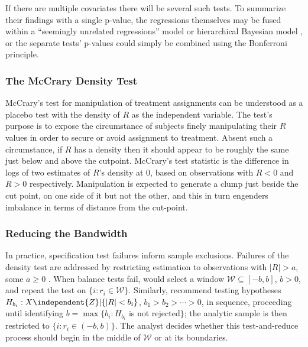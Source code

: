 If there are multiple
covariates there will be several such tests. To summarize their
findings with a single p-value, the
regressions themselves may be fused within a
``seemingly unrelated regressions'' model \citep{lee2010regression} or
hierarchical Bayesian model
\citep{liMatteiMealli2015BayesianRD}, or the
separate tests' p-values could simply be combined using the Bonferroni
principle.

\subsubsection{The McCrary Density Test}
McCrary's test for manipulation of treatment assignments
\citeyearpar{mccrary2008manipulation} can be understood as a %
placebo test with the density of $R$ as the independent variable.
The test's
purpose is to expose the circumstance of subjects finely manipulating their
$R$ values in order to secure or avoid assignment to treatment.  Absent
such a circumstance, if $R$ has a density then it should appear to be
roughly the same just below and above the cutpoint.  McCrary's
\citeyearpar{mccrary2008manipulation} test statistic is the difference
in logs of two estimates of $R$'s density at 0, based on observations
with $R<0$ and $R>0$ respectively.
Manipulation is expected to generate a clump just beside the cut
point, on one side of it but not the other, and this in turn engenders
imbalance in terms of distance from the cut-point.

\subsubsection{Reducing the Bandwidth}
In practice, specification test failures inform sample exclusions.
Failures of the density test are addressed by restricting
estimation to observations with $|R|>a$, some $a \geq 0$
\citep[e.g.,][]{barrecaetal2011birthweightRDD,eggers2014validity}.
When balance tests fail,
\citet{lee2010regression} would select a window
$\mathcal{W} \subseteq [-b, b]$, $b>0$, %
and repeat the test on $\{i : r_{i} \in \mathcal{W}\}$. Similarly,
\citet{cattaneo2014randomization} recommend testing hypotheses
$H_{b_{i}}: {X} \independent {Z}| \{|R| < b_{i}\}$, $b_1 > b_2 > \cdots >0$, in sequence,
proceeding until identifying  $b = \max \{ b_i: H_{b_{i}}$ is not rejected$\}$;
the analytic sample is then restricted to  $\{i: r_{i} \in (-b,b)\}$.
The analyst decides whether this test-and-reduce process
should begin in the middle of $\mathcal{W}$ or at its boundaries.

